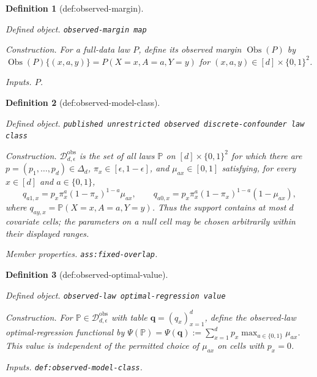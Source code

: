 \documentclass{article}
\newtheorem{definition}{Definition}
\begin{document}
\begin{definition}[def:observed-margin]\label{def:observed-margin}
\par\smallskip\noindent\emph{Defined object.} \texttt{observed-\allowbreak{}margin map}
\par\smallskip\noindent\emph{Construction.} For a full-data law \(P\), define its observed margin \(\operatorname{Obs}(P)\) by \(\operatorname{Obs}(P)\{(x,a,y)\}=P(X=x,A=a,Y=y)\) for \((x,a,y)\in[d]\times\{0,1\}^2\).
\par\smallskip\noindent\emph{Inputs.} \(P\).
\end{definition}

\begin{definition}[def:observed-model-class]\label{def:observed-model-class}
\par\smallskip\noindent\emph{Defined object.} \texttt{published unrestricted observed discrete-\allowbreak{}confounder law class}
\par\smallskip\noindent\emph{Construction.} \(\mathcal D_{d,\epsilon}^{\mathrm{obs}}\) is the set of all laws \(\mathbb P\) on \([d]\times\{0,1\}^2\) for which there are \(p=(p_1,\ldots,p_d)\in\Delta_d\), \(\pi_x\in[\epsilon,1-\epsilon]\), and \(\mu_{ax}\in[0,1]\) satisfying, for every \(x\in[d]\) and \(a\in\{0,1\}\),
\[
 q_{a1,x}=p_x\pi_x^a(1-\pi_x)^{1-a}\mu_{ax},\qquad
 q_{a0,x}=p_x\pi_x^a(1-\pi_x)^{1-a}(1-\mu_{ax}),
\]
where \(q_{ay,x}=\mathbb P(X=x,A=a,Y=y)\).  Thus the support contains at most \(d\) covariate cells; the parameters on a null cell may be chosen arbitrarily within their displayed ranges.
\par\smallskip\noindent\emph{Member properties.} \texttt{ass:\allowbreak{}fixed-\allowbreak{}overlap}.
\end{definition}

\begin{definition}[def:observed-optimal-value]\label{def:observed-optimal-value}
\par\smallskip\noindent\emph{Defined object.} \texttt{observed-\allowbreak{}law optimal-\allowbreak{}regression value}
\par\smallskip\noindent\emph{Construction.} For \(\mathbb P\in\mathcal D_{d,\epsilon}^{\mathrm{obs}}\) with table \(\mathbf q=(q_x)_{x=1}^d\), define the observed-law optimal-regression functional by \(\Psi(\mathbb P)=\Psi(\mathbf q):=\sum_{x=1}^d p_x\max_{a\in\{0,1\}}\mu_{ax}\).  This value is independent of the permitted choice of \(\mu_{ax}\) on cells with \(p_x=0\).
\par\smallskip\noindent\emph{Inputs.} \texttt{def:\allowbreak{}observed-\allowbreak{}model-\allowbreak{}class}.
\end{definition}
\end{document}
